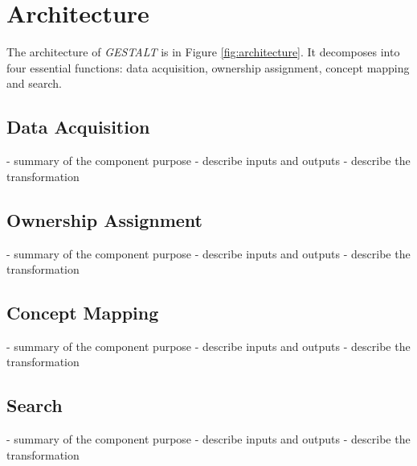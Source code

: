 \section{Architecture}
\label{section:architecture}

\begin{figure*}[t]
	\label{fig:architecture}
	
	\centering
	\caption[width=\textwidth]{The architecture of \textit{GESTALT} consists of the data collection subsystem, the ownership assignment process, the concept mapping process and the search subsystem.}
\end{figure*}

The architecture of \textit{GESTALT} is in Figure \ref{fig:architecture}. It decomposes into four essential functions: data acquisition, ownership assignment, concept mapping and search. 

\subsection{Data Acquisition}
- summary of the component purpose
- describe inputs and outputs
- describe the transformation


\subsection{Ownership Assignment}
- summary of the component purpose
- describe inputs and outputs
- describe the transformation


\subsection{Concept Mapping}
- summary of the component purpose
- describe inputs and outputs
- describe the transformation


\subsection{Search}
- summary of the component purpose
- describe inputs and outputs
- describe the transformation

